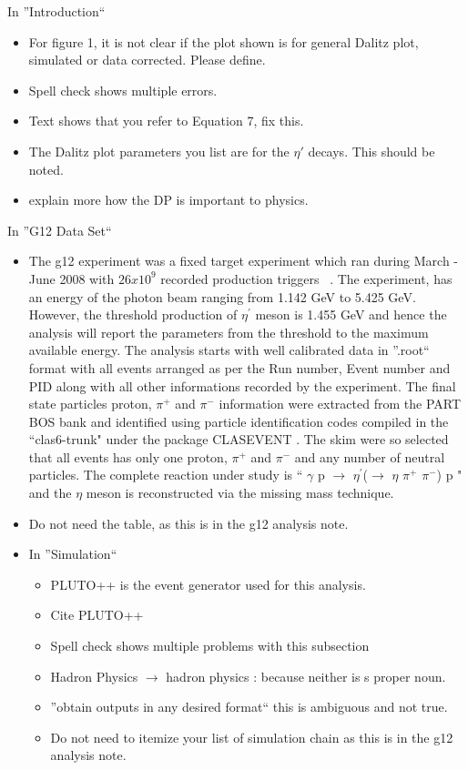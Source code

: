\documentclass[10pt,a4paper]{report}
\author{Michael C. Kunkel}
\begin{document}
	In ''Introduction``
	\begin{itemize}
		\item For figure 1, it is not clear if the plot shown is for general Dalitz plot, simulated or data corrected. Please define.
		\item Spell check shows multiple errors.
		\item Text shows that you refer to Equation 7, fix this.
		\item The Dalitz plot parameters you list are for the $\eta'$ decays. This should be noted.
		\item explain more how the DP is important to physics.
	\end{itemize}
	In ''G12 Data Set``
	\begin{itemize}
		\item The g12 experiment was a fixed target experiment which ran during March - June 2008 with $26 x 10^{9}$ recorded production triggers ~\cite{G12_AN}.  The experiment, has an energy of the photon beam ranging from 1.142 GeV to  5.425 GeV. However, the threshold production of $\eta^{\prime}$ meson is 1.455 GeV and hence the analysis will report the parameters from the threshold to the maximum available energy. The analysis starts with well calibrated data in ''.root`` format with all events arranged as per the Run number, Event number and PID along with all other informations recorded by the experiment. The final state particles proton, $\pi^{+}$ and $\pi^{-}$ information were extracted from the PART BOS bank and identified using particle identification codes compiled in the ``clas6-trunk" under the package CLASEVENT . The skim were so selected that all events has only one proton, $\pi^{+}$ and $\pi^{-}$ and any number of neutral particles. 
		The complete reaction under study is `` $\gamma$ p $\rightarrow$ $\eta^{\prime}$($\rightarrow$ $\eta$ $\pi^{+}$ $\pi^{-}$) p " and the $\eta$ meson is reconstructed via the missing mass technique. 
		\item Do not need the table, as this is in the g12 analysis note.
		\item In ''Simulation``
	\begin{itemize}
		\item PLUTO++ is the event generator used for this analysis. 
		\item Cite PLUTO++
		\item Spell check shows multiple problems with this subsection
		\item Hadron Physics $\rightarrow$ hadron physics : because neither is s proper noun.
		\item ''obtain outputs in any desired format`` this is ambiguous and not true.
		\item Do not need to itemize your list of simulation chain as this is in the g12 analysis note.
	\end{itemize}
	\end{itemize}		
\end{document}
